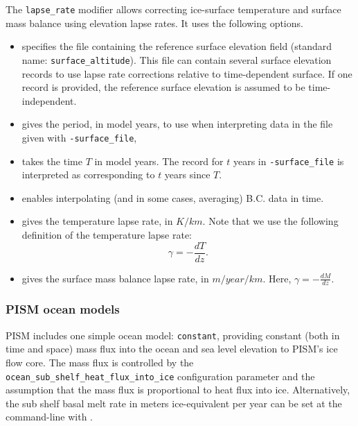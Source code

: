   The \texttt{lapse_rate} modifier allows correcting ice-surface temperature and surface mass balance using elevation lapse rates. It uses the following options.
  \begin{itemize}
  \item {} specifies the file containing the reference surface elevation field (standard name: \texttt{surface_altitude}). This file can contain several surface elevation records to use lapse rate corrections relative to time-dependent surface. If one record is provided, the reference surface elevation is assumed to be time-independent.
  \item {} gives the period, in model years, to use when interpreting data in the file given with \texttt{-surface_file},
  \item {} takes the time $T$ in model years. The record for $t$ years in \texttt{-surface_file} is interpreted as corresponding to $t$ years since $T$.
  \item {} enables interpolating (and in some cases, averaging) B.C. data in time.
  \item {} gives the temperature lapse rate, in $K/km$. Note that we use the following definition of the temperature lapse rate:
    \begin{displaymath}
      \gamma = -\frac{dT}{dz}.
    \end{displaymath}
  \item {} gives the surface mass balance lapse rate, in $m/year/km$. Here, $\gamma=-\frac{dM}{dz}$.
  \end{itemize}


\subsubsection{PISM ocean models}
\label{sec:pism-ocean-models}

PISM includes one simple ocean model: \texttt{constant}, providing constant (both in time and space) mass flux into the ocean and sea level elevation to PISM's ice flow core. The mass flux is controlled by the\\ \texttt{ocean_sub_shelf_heat_flux_into_ice} configuration parameter and the assumption that the mass flux is proportional to heat flux into ice. Alternatively, the sub shelf basal melt rate in meters ice-equivalent per year can be set at the command-line with .

